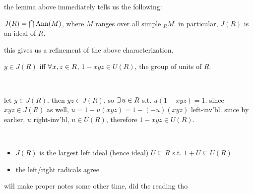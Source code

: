 the lemma above immediately tells us the following:

\begin{crll}
	$J(R) = \bigcap\operatorname{Ann}(M)$, where $M$ ranges over all simple $_{R}M$.
	in particular, $J(R)$ is an ideal of $R$.
\end{crll}
this gives us a refinement of the above characterization.

\begin{lm}
	$y\in J(R)$ iff $\fa x,z\in R$, $1-xyz\in U(R)$, the group of units of $R$.
\end{lm}\

\begin{pf}[source=Primary Source Material]
	let $y\in J(R)$. then $yz\in J(R)$, so $\ex u\in R$ s.t. $u(1-xyz)=1$.
	since $xyz\in J(R)$ as well, $u=1+u(xyz)=1-(-u)(xyz)$ left-inv'bl.
	since by earlier, $u$ right-inv'bl, $u\in U(R)$, therefore $1-xyz\in U(R)$.
\end{pf} \

\begin{crll} \vspace{-0.2in}
	\begin{itemize}
		\item $J(R)$ is the largest left ideal (hence ideal) $U\subseteq R$
			s.t. $1+U\subseteq U(R)$
		\item the left/right radicals agree
	\end{itemize}
\end{crll}

will make proper notes some other time, did the reading tho



